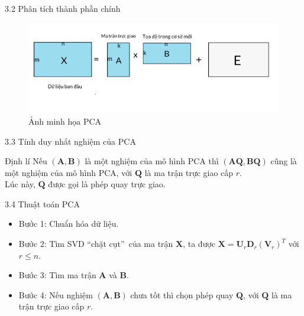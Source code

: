 \documentclass[notheorems,envcountsect,hyperref=unicode]{beamer}
\def\A{\mathcal{A}}
\def\Lp{\mathbf{L_p}}
\def\disint{\displaystyle\int}
\def\kgdd{(X,\A,\mu)}
\begin{document}
\begin{frame}{3.2 Phân tích thành phần chính}
\begin{figure}[htp]
	\includegraphics[scale=0.6]{pca_idea.PNG}
	\caption{ Ảnh minh họa PCA}
\end{figure}	
	
\end{frame}

%	
%	
\begin{frame}{3.3 Tính duy nhất nghiệm của PCA }
\begin{block}{\textnormal{Định lí}}
Nếu $(\mathbf{A, B})$ là một nghiệm của mô hình PCA thì $(\mathbf{A Q, B Q})$ cũng là một nghiệm của mô hình PCA, với $\mathbf{Q}$ là ma trận trực giao cấp $r$.\\
Lúc này, $\mathbf{Q}$ được gọi là phép quay trực giao.
\end{block}
%
%
\end{frame}

\begin{frame}{3.4 Thuật toán PCA}
\begin{itemize}
	
\item{Bước 1:} Chuẩn hóa dữ liệu.
\item{Bước 2:} Tìm SVD \textquotedblleft chặt cụt\textquotedblright\ của ma trận $\mathbf{X}$, ta được $\mathbf{X}=\mathbf{U}_{r} \mathbf{D}_{r}\left(\mathbf{V}_{r}\right)^{T}$ với $r \leq n$.
\item{Bước 3:} Tìm ma trận $\mathbf{A}$ và $\mathbf{B}$.
\item{Bước 4:} Nếu nghiệm $(\mathbf{A, B})$ chưa tốt thì chọn phép quay $\mathbf{Q}$, với $\mathbf{Q}$ là ma trận trực giao cấp $r$.
\end{itemize}	
\end{frame}
\end{document}
